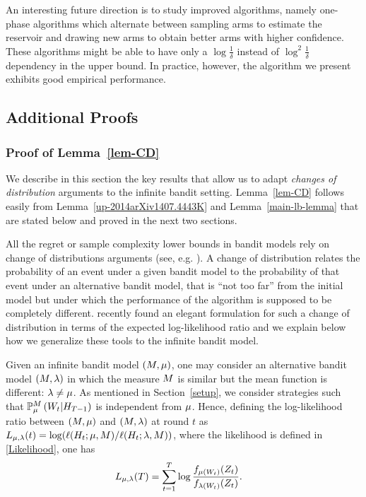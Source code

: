 An interesting future direction is to study improved algorithms, namely
one-phase algorithms which alternate between sampling arms to estimate the 
reservoir and drawing new arms to obtain better arms with higher confidence.
These algorithms might be able to have only a $\log\frac{1}{\delta}$ instead of
$\log^2 \frac{1}{\delta}$ dependency in the upper bound.
In practice, however, the algorithm we present exhibits good empirical 
performance.

\newpage
%

\subsection{Additional Proofs}\label{supp-proofs}

\subsubsection{Proof of Lemma~\ref{lem-CD}} \label{proof-CD}

We describe in this section the key results that allow us to adapt
\emph{changes of distribution} arguments to the infinite bandit setting.
Lemma~\ref{lem-CD} follows easily from Lemma~\ref{up-2014arXiv1407.4443K} and 
Lemma~\ref{main-lb-lemma} that are stated below and proved in the next two sections.

All the regret or sample complexity lower bounds in bandit models rely on
change of distributions arguments (see, e.g.
\cite{LaiRobbins85bandits,BurnKat96,DBLP:conf/colt/AudibertBM10}). A change of distribution
relates the probability of an event under a given bandit model to the
probability of that event under an alternative bandit model, that is ``not too
far'' from the initial model but under which the performance of the algorithm
is supposed to be completely different. \cite{Combes14Lip,JMLR15} recently
found an elegant formulation for such a change of distribution in terms of the
expected log-likelihood ratio and we explain below how we generalize these
tools to the infinite bandit model.

Given an infinite bandit model $(M,\mu)$, one may consider an alternative
bandit model $(M,\lambda)$ in which the measure $M$ is similar but the
mean function is different: $\lambda \neq \mu$. As mentioned in
Section~\ref{setup}, we consider strategies such that
$\mathbb{P}_{\mu}^M\left(  W_t | H_{T-1}  \right)$ is independent from $\mu$. Hence, defining the log-likelihood
ratio between $(M,\mu)$ and $(M,\lambda)$ at round $t$ as
$L_{\mu,\lambda}(t) = \log(\ell(H_t ; \mu,M) / \ell(H_t; \lambda,M))$, where the likelihood is defined in 
\eqref{Likelihood}, one has 
\begin{align}
L_{\mu,\lambda}(T)
    &= \sum_{t=1}^T \log \frac{f_{\mu(W_t)}(Z_t)}{f_{\lambda(W_t)}(Z_t)}.\label{logLikelihood}
\end{align}

